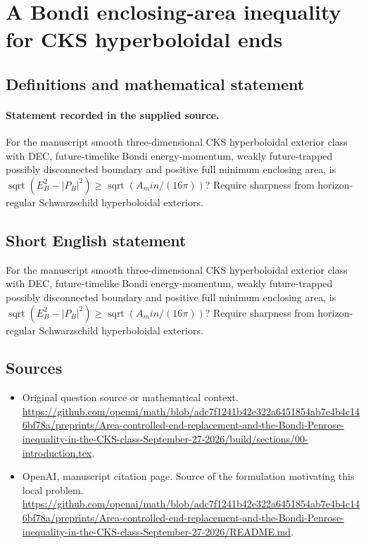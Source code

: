 \documentclass[11pt]{article}
\begin{document}
\section*{A Bondi enclosing-area inequality for CKS hyperboloidal ends}\label{statement}
\subsection{Definitions and mathematical statement}
\paragraph{Statement recorded in the supplied source.}
For the manuscript smooth three-dimensional CKS hyperboloidal exterior class with DEC, future-timelike Bondi energy-momentum, weakly future-trapped possibly disconnected boundary and positive full minimum enclosing area, is $\operatorname{sqrt}(E_B^2-|P_B|^2)\geq \operatorname{sqrt}(A_min/(16\pi ))$? Require sharpness from horizon-regular Schwarzschild hyperboloidal exteriors.
\subsection{Short English statement}
For the manuscript smooth three-dimensional CKS hyperboloidal exterior class with DEC, future-timelike Bondi energy-momentum, weakly future-trapped possibly disconnected boundary and positive full minimum enclosing area, is $\operatorname{sqrt}(E_B^2-|P_B|^2)\geq \operatorname{sqrt}(A_min/(16\pi ))$? Require sharpness from horizon-regular Schwarzschild hyperboloidal exteriors.
\subsection{Sources}
\begin{itemize}
\item[S1] Original question source or mathematical context.
\url{https://github.com/openai/math/blob/adc7f1241b42e322a6451854ab7e4b4c146bf78a/preprints/Area-controlled-end-replacement-and-the-Bondi-Penrose-inequality-in-the-CKS-class-September-27-2026/build/sections/00-introduction.tex}.
\item[S2] OpenAI, manuscript citation page. Source of the formulation motivating this local problem.
\url{https://github.com/openai/math/blob/adc7f1241b42e322a6451854ab7e4b4c146bf78a/preprints/Area-controlled-end-replacement-and-the-Bondi-Penrose-inequality-in-the-CKS-class-September-27-2026/README.md}.
\end{itemize}
\end{document}
